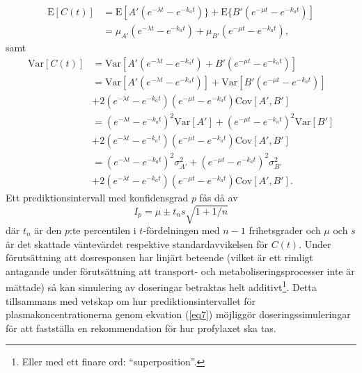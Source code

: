 \documentclass[a4paper,11pt]{article}
\begin{document}
\begin{align}
\mathrm{E}[C(t)] & = \mathrm{E}[A'(e^{-\lambda t} - e^{-k_a t})\} + \mathrm{E}\{B'(e^{-\mu t} - e^{-k_a t})] \nonumber \\
& = \mu_{A'}(e^{-\lambda t} - e^{-k_a t}) + \mu_{B'}(e^{-\mu t} - e^{-k_a t}),
\label{eq5}
\end{align}
samt
\begin{align}
\mathrm{Var}[C(t)] & = \mathrm{Var}[A'(e^{-\lambda t} - e^{-k_a t}) + B'(e^{-\mu t} - e^{-k_a t})] \nonumber \\ 
& =  \mathrm{Var}[A'(e^{-\lambda t} - e^{-k_a t})] + \mathrm{Var}[B'(e^{-\mu t} - e^{-k_a t})] \nonumber \\
& + 2(e^{-\lambda t} - e^{-k_a t})(e^{-\mu t} - e^{-k_a t})\mathrm{Cov}[A',B'] \nonumber \\ 
& = (e^{-\lambda t} - e^{-k_a t})^2\mathrm{Var}[A'] + (e^{-\mu t} - e^{-k_a t})^2\mathrm{Var}[B'] \nonumber \\
& +  2(e^{-\lambda t} - e^{-k_a t})(e^{-\mu t} - e^{-k_a t})\mathrm{Cov}[A',B'] \nonumber \\ 
& = (e^{-\lambda t} - e^{-k_a t})^2\sigma_{A'}^2 + (e^{-\mu t} - e^{-k_a t})^2\sigma_{B'}^2 \nonumber \\
& +  2(e^{-\lambda t} - e^{-k_a t})(e^{-\mu t} - e^{-k_a t})\mathrm{Cov}[A',B'].
\label{eq6}
\end{align}
Ett prediktionsintervall med konfidensgrad $p$ fås då av
\begin{equation}
I_p = \mu \pm t_n s \sqrt{1 + 1/n}
\label{eq7}
\end{equation}
där $t_n$ är den $p$:te percentilen i $t$-fördelningen med $n-1$ frihetsgrader och $\mu$ och $s$ är det skattade väntevärdet respektive standardavvikelsen för $C(t)$. Under förutsättning att dosresponsen har linjärt beteende (vilket är ett rimligt antagande under förutsättning att transport- och metaboliseringsprocesser inte är mättade) så kan simulering av doseringar betraktas helt additivt\footnote{Eller med ett finare ord: ``superposition''.}. Detta tillsammans med vetskap om hur prediktionsintervallet för plasmakoncentrationerna genom ekvation (\ref{eq7}) möjliggör doseringssimuleringar för att fastställa en rekommendation för hur profylaxet ska tas.
\end{document}
